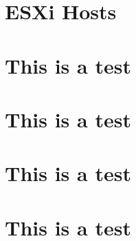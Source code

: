 \documentclass[12pt]{IEEEtran}
\begin{document}
\section{ESXi Hosts}
\blindtext
\section{This is a test}
\blindtext
\section{This is a test}
\blindtext
\section{This is a test}
\blindtext
\section{This is a test}
\blindtext

\end{document}
